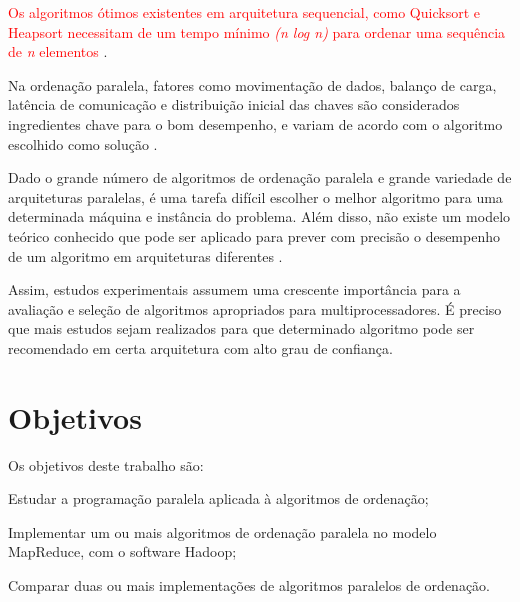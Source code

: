 
\textcolor{red}{Os algoritmos ótimos existentes em arquitetura sequencial, como Quicksort e Heapsort necessitam de um tempo mínimo \textit{(n log n)} para ordenar uma sequência de \textit{n} elementos \cite{Aho:1974}}.


Na ordenação paralela, fatores como movimentação de dados, balanço de carga, latência de comunicação e distribuição inicial das chaves são considerados ingredientes chave para o bom desempenho, e variam de acordo com o algoritmo escolhido como solução \cite{Kale:2010}. 

Dado o grande número de algoritmos de ordenação paralela e grande variedade de arquiteturas paralelas, é uma tarefa difícil escolher o melhor algoritmo para uma determinada máquina e instância do problema. Além disso, não existe um modelo teórico conhecido que pode ser aplicado para prever com precisão o desempenho de um algoritmo em arquiteturas diferentes \cite{Amato:1996}.

Assim, estudos experimentais assumem uma crescente importância para a avaliação e seleção de algoritmos apropriados para multiprocessadores. É preciso que mais estudos sejam realizados para que determinado algoritmo pode ser recomendado em certa arquitetura com alto grau de confiança.

\section{Objetivos}

Os objetivos deste trabalho são:

\begin{packed_enum}
\item Estudar a programação paralela aplicada à algoritmos de ordenação;
\item Implementar um ou mais algoritmos de ordenação paralela no modelo MapReduce, com o software Hadoop;
\item Comparar duas ou mais implementações de algoritmos paralelos de ordenação.
\end{packed_enum}



